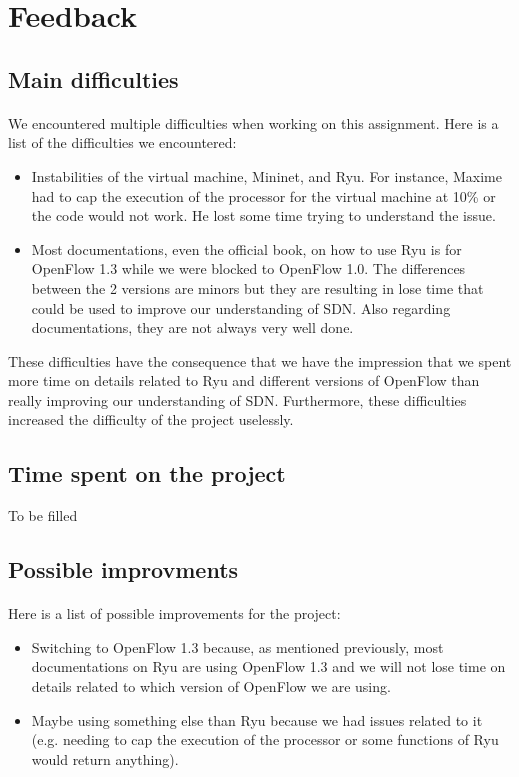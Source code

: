 \documentclass[a4paper, 11pt, oneside]{article}
\begin{document}

\section{Feedback} \label{sec:feedback}
\subsection{Main difficulties}
\paragraph{}We encountered multiple difficulties when working on this assignment. Here is a list of the difficulties we encountered:
\begin{itemize}
\item Instabilities of the virtual machine, Mininet, and Ryu. For instance, Maxime had to cap the execution of the processor for the virtual machine at 10\% or the code would not work. He lost some time trying to understand the issue.
\item Most documentations, even the official book, on how to use Ryu is for OpenFlow 1.3 while we were blocked to OpenFlow 1.0. The differences between the 2 versions are minors but they are resulting in lose time that could be used to improve our understanding of SDN. Also regarding documentations, they are not always very well done.
\end{itemize}
These difficulties have the consequence that we have the impression that we spent more time on details related to Ryu and different versions of OpenFlow than really improving our understanding of SDN. Furthermore, these difficulties increased the difficulty of the project uselessly.

\subsection{Time spent on the project}
To be filled

\subsection{Possible improvments}
\paragraph{}Here is a list of possible improvements for the project:
\begin{itemize}
\item Switching to OpenFlow 1.3 because, as mentioned previously, most documentations on Ryu are using OpenFlow 1.3 and we will not lose time on details related to which version of OpenFlow we are using.
\item Maybe using something else than Ryu because we had issues related to it (e.g. needing to cap the execution of the processor or some functions of Ryu would return anything).
\end{itemize}

\end{document}
